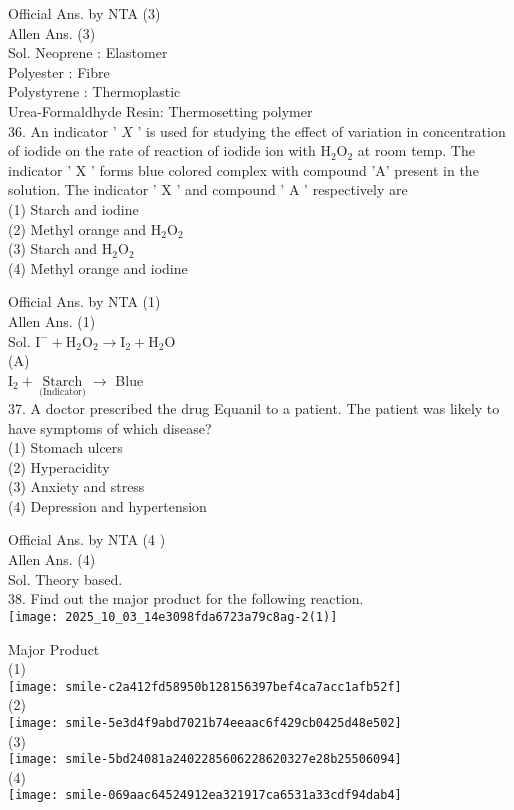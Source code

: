 \documentclass[10pt]{article}
\begin{document}
Official Ans. by NTA (3)\\
Allen Ans. (3)\\
Sol. Neoprene : Elastomer\\
Polyester : Fibre\\
Polystyrene : Thermoplastic\\
Urea-Formaldhyde Resin: Thermosetting polymer\\
36. An indicator ' \(X\) ' is used for studying the effect of variation in concentration of iodide on the rate of reaction of iodide ion with \(\mathrm{H}_{2} \mathrm{O}_{2}\) at room temp. The indicator ' X ' forms blue colored complex with compound 'A' present in the solution. The indicator ' X ' and compound ' A ' respectively are\\
(1) Starch and iodine\\
(2) Methyl orange and \(\mathrm{H}_{2} \mathrm{O}_{2}\)\\
(3) Starch and \(\mathrm{H}_{2} \mathrm{O}_{2}\)\\
(4) Methyl orange and iodine

Official Ans. by NTA (1)\\
Allen Ans. (1)\\
Sol. \(\mathrm{I}^{-}+\mathrm{H}_{2} \mathrm{O}_{2} \longrightarrow \mathrm{I}_{2}+\mathrm{H}_{2} \mathrm{O}\)\\
(A)\\
\(\mathrm{I}_{2}+\underset{\text { (Indicator) }}{\text { Starch }} \longrightarrow\) Blue\\
37. A doctor prescribed the drug Equanil to a patient. The patient was likely to have symptoms of which disease?\\
(1) Stomach ulcers\\
(2) Hyperacidity\\
(3) Anxiety and stress\\
(4) Depression and hypertension

Official Ans. by NTA (4 )\\
Allen Ans. (4)\\
Sol. Theory based.\\
38. Find out the major product for the following reaction.\\
\texttt{[image: 2025\_10\_03\_14e3098fda6723a79c8ag-2(1)]}

Major Product\\
(1)\\
\texttt{[image: smile-c2a412fd58950b128156397bef4ca7acc1afb52f]}\\
(2)\\
\texttt{[image: smile-5e3d4f9abd7021b74eeaac6f429cb0425d48e502]}\\
(3)\\
\texttt{[image: smile-5bd24081a2402285606228620327e28b25506094]}\\
(4)\\
\texttt{[image: smile-069aac64524912ea321917ca6531a33cdf94dab4]}
\end{document}
